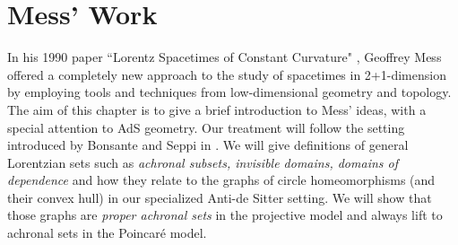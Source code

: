 \chapter{Mess' Work}

In his 1990 paper “Lorentz Spacetimes of Constant Curvature" \cite{Mess}, Geoffrey Mess offered a completely new approach to the study of spacetimes in 2+1-dimension by employing tools and techniques from low-dimensional geometry and topology. The aim of this chapter is to give a brief introduction to Mess' ideas, with a special attention to AdS geometry. Our treatment will follow the setting introduced by Bonsante and Seppi in \cite{bonsanteseppi}. We will give definitions of general Lorentzian sets such as \textit{achronal subsets, invisible domains, domains of dependence} and how they relate to the graphs of circle homeomorphisms (and their convex hull) in our specialized Anti-de Sitter setting. We will show that those graphs are \textit{proper achronal sets} in the projective model and always lift to achronal sets in the Poincaré model.


